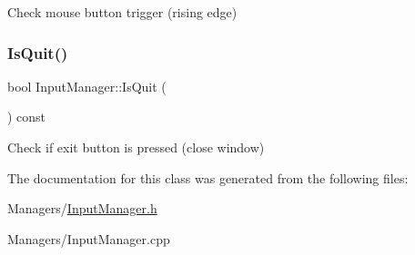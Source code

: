 Check mouse button trigger (rising edge) \mbox{\label{classInputManager_a926e42475408a078ebe5395f95289df2}} 
\subsubsection{\texorpdfstring{Is\+Quit()}{IsQuit()}}
{\footnotesize\ttfamily bool Input\+Manager\+::\+Is\+Quit (\begin{DoxyParamCaption}{ }\end{DoxyParamCaption}) const}

Check if exit button is pressed (close window) 

The documentation for this class was generated from the following files\+:\begin{DoxyCompactItemize}
\item 
Managers/\hyperlink{InputManager_8h}{Input\+Manager.\+h}\item 
Managers/Input\+Manager.\+cpp\end{DoxyCompactItemize}

